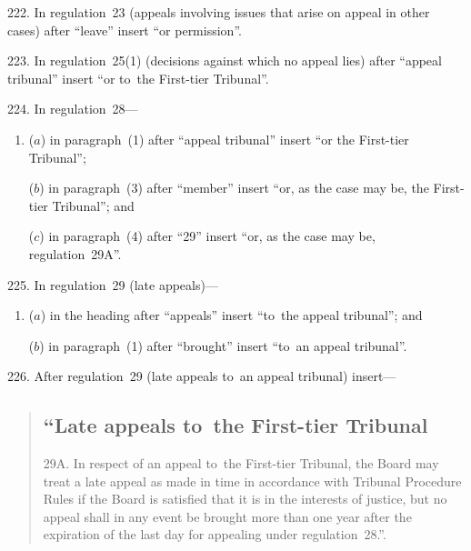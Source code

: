 \documentclass[12pt,a4paper]{article}
\begin{document}
\medskip

222.  In regulation~23 (appeals involving issues that arise on appeal in other cases) after “leave” insert “or permission”.

\medskip

223.  In regulation~25(1) (decisions against which no appeal lies) after “appeal tribunal” insert “or to~the First-tier Tribunal”.

\medskip

224.  In regulation~28—
\begin{enumerate}\item[]
($a$) in paragraph~(1) after “appeal tribunal” insert “or the First-tier Tribunal”;

($b$) in paragraph~(3) after “member” insert “or, as the case may be, the First-tier Tribunal”; and

($c$) in paragraph~(4) after “29” insert “or, as the case may be, regulation~29A”.
\end{enumerate}

\medskip

225.  In regulation~29 (late appeals)—
\begin{enumerate}\item[]
($a$) in the heading after “appeals” insert “to~the appeal tribunal”; and

($b$) in paragraph~(1) after “brought” insert “to~an appeal tribunal”.
\end{enumerate}

\medskip

226.  After regulation~29 (late appeals to~an appeal tribunal) insert—
\begin{quotation}
\subsection*{“Late appeals to~the First-tier Tribunal}

29A.    In respect of an appeal to~the First-tier Tribunal, the Board may treat a late appeal as made in time in accordance with Tribunal Procedure Rules if the Board is satisfied that it is in the interests of justice, but no appeal shall in any event be brought more than one year after the expiration of the last day for appealing under regulation~28.”. 
\end{quotation}

\medskip
\end{document}
